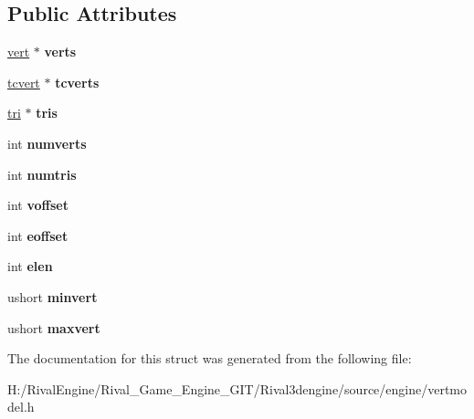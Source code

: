 \subsection*{Public Attributes}
\begin{DoxyCompactItemize}
\item 
\mbox{\label{structvertmodel_1_1vertmesh_a8e51bff5830beeecefbb931f6ef4167a}} 
\hyperlink{structvertmodel_1_1vert}{vert} $\ast$ {\bfseries verts}
\item 
\mbox{\label{structvertmodel_1_1vertmesh_a2efa91db3b6322cea5174acfb212d79b}} 
\hyperlink{structvertmodel_1_1tcvert}{tcvert} $\ast$ {\bfseries tcverts}
\item 
\mbox{\label{structvertmodel_1_1vertmesh_a58bab6e73d5d8ebe6e6719052b17ac24}} 
\hyperlink{structvertmodel_1_1tri}{tri} $\ast$ {\bfseries tris}
\item 
\mbox{\label{structvertmodel_1_1vertmesh_a79af03e3db6facb956773310898019e1}} 
int {\bfseries numverts}
\item 
\mbox{\label{structvertmodel_1_1vertmesh_a537f86d242bfc6991df313cdf10d6588}} 
int {\bfseries numtris}
\item 
\mbox{\label{structvertmodel_1_1vertmesh_a27206a6a1e5a597d76296ccf2963ce49}} 
int {\bfseries voffset}
\item 
\mbox{\label{structvertmodel_1_1vertmesh_a23a0f086435c3c601f5e1f167a908580}} 
int {\bfseries eoffset}
\item 
\mbox{\label{structvertmodel_1_1vertmesh_abab6fa0f66b26126936ff7cc168febd3}} 
int {\bfseries elen}
\item 
\mbox{\label{structvertmodel_1_1vertmesh_af3eafc73f5060f264968590e954285c5}} 
ushort {\bfseries minvert}
\item 
\mbox{\label{structvertmodel_1_1vertmesh_a73434aa837a2d3ced2805138aadd0e40}} 
ushort {\bfseries maxvert}
\end{DoxyCompactItemize}


The documentation for this struct was generated from the following file\+:\begin{DoxyCompactItemize}
\item 
H\+:/\+Rival\+Engine/\+Rival\+\_\+\+Game\+\_\+\+Engine\+\_\+\+G\+I\+T/\+Rival3dengine/source/engine/vertmodel.\+h\end{DoxyCompactItemize}

